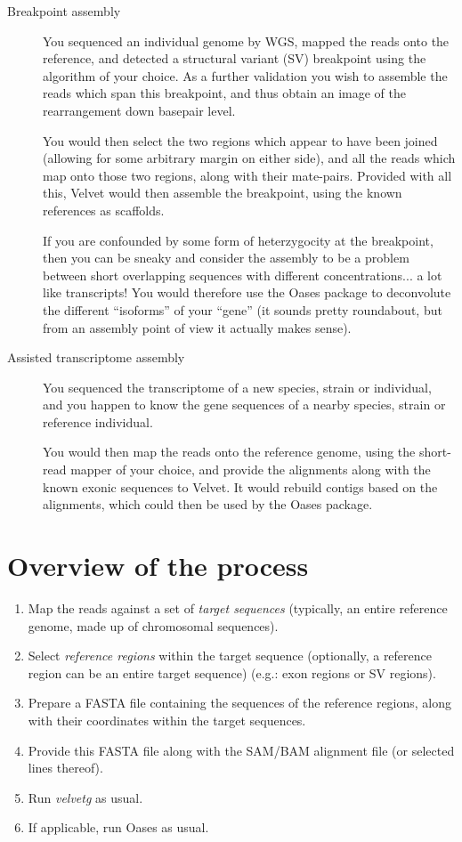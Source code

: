 \documentclass[12pt]{article}
\begin{document}
\begin{description}
\item[Breakpoint assembly]

You sequenced an individual genome by WGS, mapped the reads onto the reference, and detected a structural variant (SV) breakpoint using the algorithm of your choice.  As a further validation you wish to assemble the reads which span this breakpoint, and thus obtain an image of the rearrangement down basepair level.

You would then select the two regions which appear to have been joined (allowing for some arbitrary margin on either side), and all the reads which map onto those two regions, along with their mate-pairs. Provided with all this, Velvet would then assemble the breakpoint, using the known references as scaffolds.

If you are confounded by some form of heterzygocity at the breakpoint, then you can be sneaky and consider the assembly to be a problem between short
overlapping sequences with different concentrations... a lot like transcripts! You would therefore use the Oases package to deconvolute the different
``isoforms'' of your ``gene'' (it sounds pretty roundabout, but from an assembly point of view it actually makes sense).

\item[Assisted transcriptome assembly]

You sequenced the transcriptome of a new species, strain or individual, and you happen to know the gene sequences of a nearby species, strain or reference individual.

You would then map the reads onto the reference genome, using the short-read mapper of your choice, and provide the alignments along with the known exonic sequences to Velvet. It would rebuild contigs based on the alignments, which could then be used by the Oases package.

\end{description}

\section{Overview of the process}

\begin{enumerate}
\item Map the reads against a set of \emph{target sequences} (typically, an entire reference genome, made up of chromosomal sequences).
\item Select \emph{reference regions} within the target sequence (optionally, a reference region can be an entire target sequence) (e.g.: exon regions or SV regions).
\item Prepare a FASTA file containing the sequences of the reference regions, along with their coordinates within the target sequences.
\item Provide this FASTA file along with the SAM/BAM alignment file (or selected lines thereof).
\item Run \emph{velvetg} as usual.
\item If applicable, run Oases as usual.
\end{enumerate}
\end{document}
